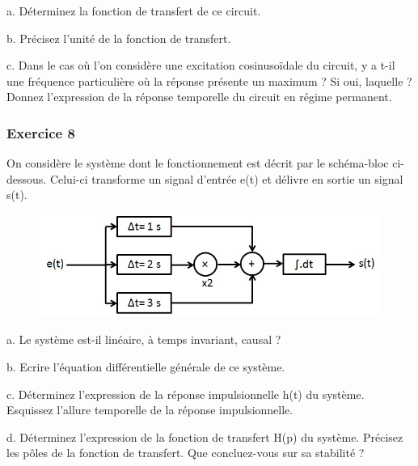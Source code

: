 	a. Déterminez la fonction de transfert de ce circuit. 
	
	b. Précisez l'unité de la fonction de transfert. 
	
	c. Dans le cas où l'on considère une excitation cosinusoïdale du circuit, y a t-il une fréquence particulière où la réponse présente un maximum ? Si oui, laquelle ? Donnez l'expression de la réponse temporelle du circuit en régime permanent.
	
	\vspace{1\baselineskip}
	
	\subsubsection{Exercice 8}
	
	On considère le système dont le fonctionnement est décrit par le schéma-bloc ci-dessous. Celui-ci transforme un signal d'entrée e(t) et délivre en sortie un signal s(t). 
	
	\begin{figure}[h!]
		\centering
		\includegraphics[scale=0.5]{images/Exo_2_6.jpg} 
	\end{figure}
	
	a. Le système est-il linéaire, à temps invariant, causal ?
	
	b. Ecrire l'équation différentielle générale de ce système.
	
	c. Déterminez l'expression de la réponse impulsionnelle h(t) du système. Esquissez l'allure temporelle de la réponse impulsionnelle. 
	
	d. Déterminez l'expression de la fonction de transfert H(p) du système. Précisez les pôles de la fonction de transfert. Que concluez-vous sur sa stabilité ?
	

	



	
